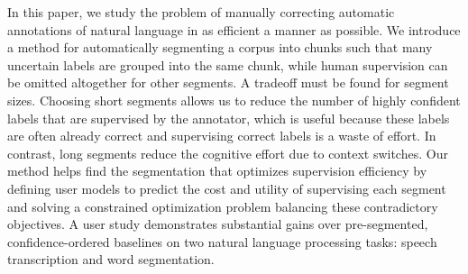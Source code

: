 In this paper, we study the problem of manually correcting automatic annotations of natural language in as efficient a manner as possible. We introduce a method for automatically segmenting a corpus into chunks such that many uncertain labels are grouped into the same chunk, while human supervision can be omitted altogether for other segments. A tradeoff must be found for segment sizes. Choosing short segments allows us to reduce the number of highly confident labels that are supervised by the annotator, which is useful because these labels are often already correct and supervising correct labels is a waste of effort. In contrast, long segments reduce the cognitive effort due to context switches. Our method helps find the segmentation that optimizes supervision efficiency by defining user models to predict the cost and utility of supervising each segment and solving a constrained optimization problem balancing these contradictory objectives. A user study demonstrates substantial gains over pre-segmented, confidence-ordered baselines on two natural language processing tasks: speech transcription and word segmentation.
